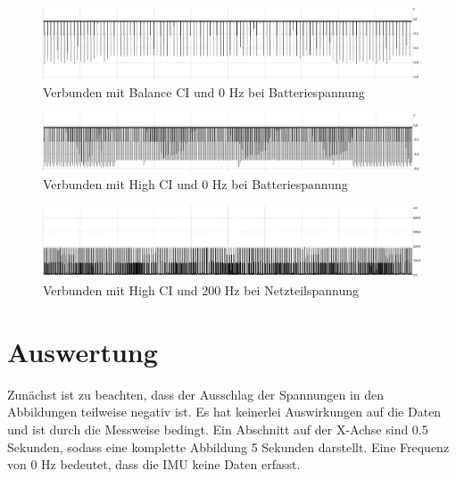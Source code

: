 \begin{figure}[!hbtp]
	\centering
	\includegraphics[width=1\linewidth]{res/ciMi0.jpg}
	\caption{Verbunden mit Balance CI und 0 Hz bei Batteriespannung}
	\label{fig:curMi}
\end{figure}
\begin{figure}[!hbtp]
	\centering
	\includegraphics[width=1\linewidth]{res/ciHi0.jpg}
	\caption{Verbunden mit High CI und 0 Hz bei Batteriespannung}
	\label{fig:curHi}
\end{figure}
\begin{figure}[!hbtp]
	\centering
	\includegraphics[width=1\linewidth]{res/wearNetzteil200hz.jpg}
	\caption{Verbunden mit High CI und 200 Hz bei Netzteilspannung}
	\label{fig:cur200}
\end{figure}

\section{Auswertung}
Zunächst ist zu beachten, dass der Ausschlag der Spannungen in den Abbildungen teilweise negativ ist.
Es hat keinerlei Auswirkungen auf die Daten und ist durch die Messweise bedingt.
Ein Abschnitt auf der X-Achse sind 0.5 Sekunden, sodass eine komplette Abbildung 5 Sekunden darstellt.
Eine Frequenz von 0 Hz bedeutet, dass die IMU keine Daten erfasst.

